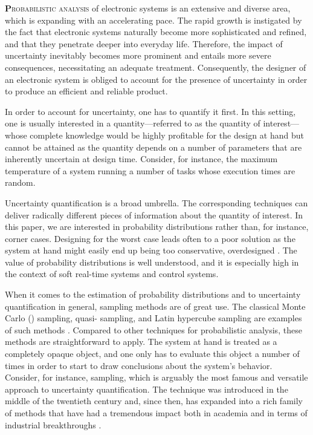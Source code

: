 \lettrine[findent=0.4em, nindent=0em]{\textbf{P}}{robabilistic analysis} of
electronic systems is an extensive and diverse area, which is expanding with an
accelerating pace. The rapid growth is instigated by the fact that electronic
systems naturally become more sophisticated and refined, and that they penetrate
deeper into everyday life. Therefore, the impact of uncertainty inevitably
becomes more prominent and entails more severe consequences, necessitating an
adequate treatment. Consequently, the designer of an electronic system is
obliged to account for the presence of uncertainty in order to produce an
efficient and reliable product.

In order to account for uncertainty, one has to quantify it first. In this
setting, one is usually interested in a quantity---referred to as the quantity
of interest---whose complete knowledge would be highly profitable for the design
at hand but cannot be attained as the quantity depends on a number of parameters
that are inherently uncertain at design time. Consider, for instance, the
maximum temperature of a system running a number of tasks whose execution times
are random.

Uncertainty quantification is a broad umbrella. The corresponding techniques can
deliver radically different pieces of information about the quantity of
interest. In this paper, we are interested in probability distributions rather
than, for instance, corner cases. Designing for the worst case leads often to a
poor solution as the system at hand might easily end up being too conservative,
overdesigned \cite{quinton2012}. The value of probability distributions is well
understood, and it is especially high in the context of soft real-time systems
and control systems.

When it comes to the estimation of probability distributions and to uncertainty
quantification in general, sampling methods are of great use. The classical
Monte Carlo () sampling, quasi- sampling, and Latin hypercube
sampling are examples of such methods \cite{asmussen2007}. Compared to other
techniques for probabilistic analysis, these methods are straightforward to
apply. The system at hand is treated as a completely opaque object, and one only
has to evaluate this object a number of times in order to start to draw
conclusions about the system's behavior. Consider, for instance, 
sampling, which is arguably the most famous and versatile approach to
uncertainty quantification. The technique was introduced in the middle of the
twentieth century and, since then, has expanded into a rich family of methods
that have had a tremendous impact both in academia and in terms of industrial
breakthroughs \cite{asmussen2007}.

